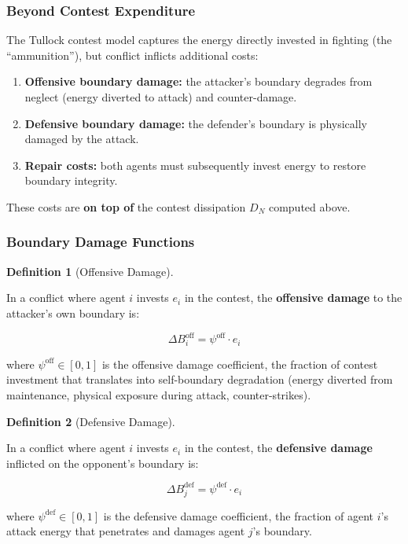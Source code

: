 \documentclass[11pt]{article}
\theoremstyle{plain}
\theoremstyle{definition}
\newtheorem{definition}{Definition}
\theoremstyle{remark}
\let\origsubsubsection\subsubsection
\renewcommand{\subsubsection}{\needspace{4\baselineskip}\origsubsubsection}
\providecommand{\tightlist}{%
  \setlength{\itemsep}{0pt}\setlength{\parskip}{0pt}}
\begin{document}
\subsubsection{Beyond Contest
Expenditure}\label{beyond-contest-expenditure}

The Tullock contest model captures the energy directly invested in
fighting (the ``ammunition''), but conflict inflicts additional costs:

\begin{enumerate}
\def\labelenumi{\arabic{enumi}.}
\tightlist
\item
  \textbf{Offensive boundary damage:} the attacker's boundary degrades
  from neglect (energy diverted to attack) and counter-damage.
\item
  \textbf{Defensive boundary damage:} the defender's boundary is
  physically damaged by the attack.
\item
  \textbf{Repair costs:} both agents must subsequently invest energy to
  restore boundary integrity.
\end{enumerate}

These costs are \textbf{on top of} the contest dissipation \(D_N\)
computed above.

\subsubsection{Boundary Damage
Functions}\label{boundary-damage-functions}

\begin{definition}[Offensive Damage]
\label{def-offensive-damage}

In a conflict where agent $i$ invests $e_i$ in the contest, the \textbf{offensive damage} to the attacker's own boundary is:

$$\Delta B_i^{\text{off}} = \psi^{\text{off}} \cdot e_i$$

where $\psi^{\text{off}} \in [0, 1]$ is the offensive damage coefficient, the fraction of contest investment that translates into self-boundary degradation (energy diverted from maintenance, physical exposure during attack, counter-strikes).
\end{definition}

\begin{definition}[Defensive Damage]
\label{def-defensive-damage}

In a conflict where agent $i$ invests $e_i$ in the contest, the \textbf{defensive damage} inflicted on the opponent's boundary is:

$$\Delta B_j^{\text{def}} = \psi^{\text{def}} \cdot e_i$$

where $\psi^{\text{def}} \in [0, 1]$ is the defensive damage coefficient, the fraction of agent $i$'s attack energy that penetrates and damages agent $j$'s boundary.
\end{definition}
\end{document}
